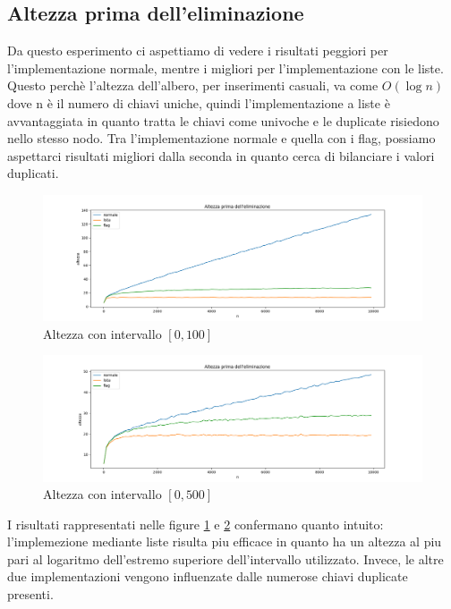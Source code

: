 \documentclass{article}
\begin{document}
\subsection{Altezza prima dell'eliminazione}
Da questo esperimento ci aspettiamo di vedere i risultati peggiori per l'implementazione normale, mentre i migliori per l'implementazione con le liste. Questo perchè l'altezza dell'albero, per inserimenti casuali, va come \( O(\log n) \) dove n è il numero di chiavi uniche, quindi l'implementazione a liste è avvantaggiata in quanto tratta le chiavi come univoche e le duplicate risiedono nello stesso nodo. Tra l'implementazione normale e quella con i flag, possiamo aspettarci risultati migliori dalla seconda in quanto cerca di bilanciare i valori duplicati.
\begin{figure}[H]
\centering
  \centering
  \includegraphics[width=\linewidth]{img/height_before_graph_100_linear.png}
  \caption{Altezza con intervallo \( [0, 100] \) }
  \label{before100}
\end{figure}
\begin{figure}[H]
\centering
  \centering
  \includegraphics[width=\linewidth]{img/height_before_graph_500_linear.png}
  \caption{Altezza con intervallo \( [0, 500] \) }
  \label{before500}
\end{figure}
I risultati rappresentati nelle figure \ref{before100} e \ref{before500} confermano quanto intuito: l'implemezione mediante liste risulta piu efficace in quanto ha un altezza al piu pari al logaritmo dell'estremo superiore dell'intervallo utilizzato. Invece, le altre due implementazioni vengono influenzate dalle numerose chiavi duplicate presenti.
\end{document}
